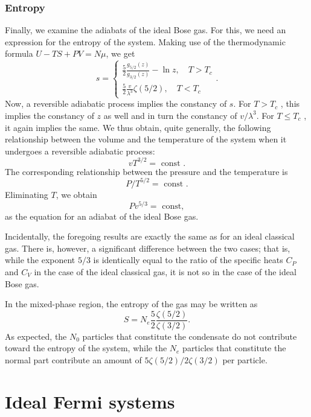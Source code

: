 \subsubsection{Entropy}
Finally, we examine the adiabats of the ideal Bose gas. For this, we need an expression for the entropy of the system. Making use of the thermodynamic formula $U - TS + PV = N\mu$, we get
\[s = \begin{cases}\frac{5}{2}\frac{g_{5/2}(z)}{g_{3/2}(z)} -\ln z , \quad T>T_c \\\frac{5}{2} \frac{v}{\lambda^3}\zeta(5/2) , \quad T < T_c  \end{cases}.\]
Now, a reversible adiabatic process implies the constancy of $s$. For $T > T_c$ , this implies the constancy of $z$ as well and in turn the constancy of $v/\lambda^3$. For $T \leq T_c$ , it again implies the same. We thus obtain, quite generally, the following relationship between the volume and the temperature of the system when it undergoes a reversible adiabatic process:
\[vT^{3/2} = \mbox{ const }.\]
The corresponding relationship between the pressure and the temperature is
\[P/T^{5/2} = \mbox{ const }.\]
Eliminating $T$, we obtain
\[Pv^{5/3} = \mbox{ const},\]
as the equation for an adiabat of the ideal Bose gas.
\begin{note}
Incidentally, the foregoing results are exactly the same as for an ideal classical gas. There is, however, a significant difference between the two cases; that is, while the exponent $5/3$ is identically equal to the ratio of the specific heats $C_P$ and $C_V$ in the case of the ideal classical gas, it is not so in the case of the ideal Bose gas.
\end{note}
\noindent
In the mixed-phase region, the entropy of the gas may be written as
\[S = N_e \frac{5}{2} \frac{\zeta(5/2)}{\zeta(3/2)}.\]
As expected, the $N_0$ particles that constitute the condensate do not contribute toward the entropy of the system, while the $N_e$ particles that constitute the normal part contribute an amount of ${5\zeta(5/2)}/{2\zeta(3/2)}$ per particle.

\section{Ideal Fermi systems}
